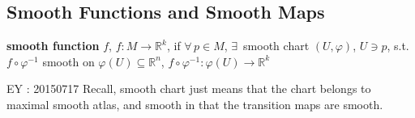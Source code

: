%                                               
%                                                              
%
 

\subsection*{Smooth Functions and Smooth Maps}

\begin{definition}
 \textbf{smooth function } $f$, $f:M \to \mathbb{R}^k$, if $\forall \, p \in M$,  $\exists \, $ smooth chart $(U,\varphi)$, $U \ni p$, s.t. $f\circ \varphi^{-1}$ smooth on $\varphi(U) \subseteq \mathbb{R}^n$, $f\circ \varphi^{-1}: \varphi(U) \to \mathbb{R}^k$
\end{definition}
EY : 20150717 Recall, smooth chart just means that the chart belongs to maximal smooth atlas, and smooth in that the transition maps are smooth.  


